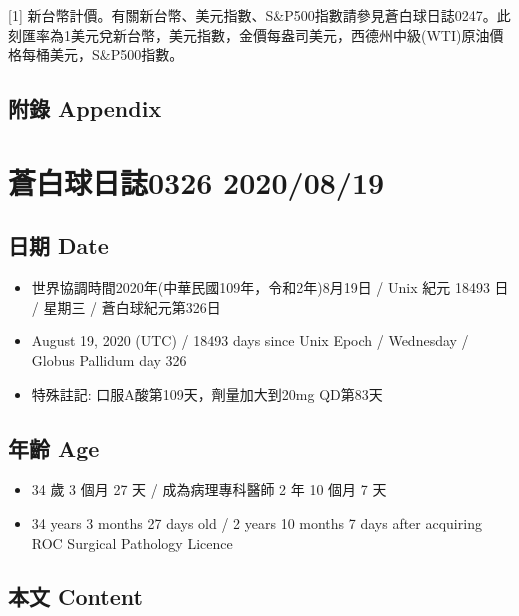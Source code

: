 \documentclass[
]{article}
\providecommand{\tightlist}{%
  \setlength{\itemsep}{0pt}\setlength{\parskip}{0pt}}
\begin{document}
{[}1{]}
新台幣計價。有關新台幣、美元指數、S\&P500指數請參見蒼白球日誌0247。此刻匯率為1美元兌新台幣，美元指數，金價每盎司美元，西德州中級(WTI)原油價格每桶美元，S\&P500指數。

\hypertarget{ux9644ux9304-appendix-17}{%
\subsection{附錄 Appendix}\label{ux9644ux9304-appendix-17}}

\hypertarget{ux84bcux767dux7403ux65e5ux8a8c0326-20200819}{%
\section{蒼白球日誌0326
2020/08/19}\label{ux84bcux767dux7403ux65e5ux8a8c0326-20200819}}

\hypertarget{ux65e5ux671f-date-18}{%
\subsection{日期 Date}\label{ux65e5ux671f-date-18}}

\begin{itemize}
\tightlist
\item
  世界協調時間2020年(中華民國109年，令和2年)8月19日 / Unix 紀元 18493 日
  / 星期三 / 蒼白球紀元第326日
\item
  August 19, 2020 (UTC) / 18493 days since Unix Epoch / Wednesday /
  Globus Pallidum day 326
\item
  特殊註記: 口服A酸第109天，劑量加大到20mg QD第83天
\end{itemize}

\hypertarget{ux5e74ux9f61-age-18}{%
\subsection{年齡 Age}\label{ux5e74ux9f61-age-18}}

\begin{itemize}
\tightlist
\item
  34 歲 3 個月 27 天 / 成為病理專科醫師 2 年 10 個月 7 天
\item
  34 years 3 months 27 days old / 2 years 10 months 7 days after
  acquiring ROC Surgical Pathology Licence
\end{itemize}

\hypertarget{ux672cux6587-content-18}{%
\subsection{本文 Content}\label{ux672cux6587-content-18}}
\end{document}
